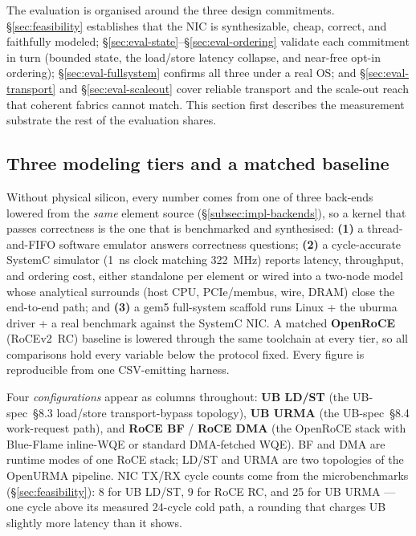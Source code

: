 \documentclass[10pt,twocolumn]{article}
\newcommand{\specsec}[1]{UB-spec~\S#1}
\begin{document}
The evaluation is organised around the three design commitments.
\S\ref{sec:feasibility} establishes that the NIC is synthesizable,
cheap, correct, and faithfully modeled;
\S\ref{sec:eval-state}--\S\ref{sec:eval-ordering} validate each
commitment in turn (bounded state, the load/store latency collapse,
and near-free opt-in ordering); \S\ref{sec:eval-fullsystem} confirms
all three under a real OS; and \S\ref{sec:eval-transport} and
\S\ref{sec:eval-scaleout} cover reliable transport and the scale-out
reach that coherent fabrics cannot match. This section first
describes the measurement substrate the rest of the evaluation
shares.

\subsection{Three modeling tiers and a matched baseline}
\label{subsec:tiers}
Without physical silicon, every number comes from one of three
back-ends lowered from the \emph{same} element source
(\S\ref{subsec:impl-backends}), so a kernel that passes correctness
is the one that is benchmarked and synthesised:
\textbf{(1)} a thread-and-FIFO software emulator answers
correctness questions; \textbf{(2)} a cycle-accurate SystemC
simulator (1~ns clock matching 322~MHz) reports latency,
throughput, and ordering cost, either standalone per element or
wired into a two-node model whose analytical surrounds (host CPU,
PCIe/membus, wire, DRAM) close the end-to-end path; and
\textbf{(3)} a gem5 full-system scaffold runs Linux + the uburma
driver + a real benchmark against the SystemC NIC. A matched
\textbf{OpenRoCE} (RoCEv2~RC) baseline is lowered through the same
toolchain at every tier, so all comparisons hold every variable
below the protocol fixed. Every figure is reproducible from one
CSV-emitting harness.

Four \emph{configurations} appear as columns throughout:
\textbf{UB LD/ST} (the \specsec{8.3} load/store transport-bypass topology),
\textbf{UB URMA} (the \specsec{8.4} work-request path), and \textbf{RoCE
BF} / \textbf{RoCE DMA} (the OpenRoCE stack with Blue-Flame
inline-WQE or standard DMA-fetched WQE). BF and DMA are runtime
modes of one RoCE stack; LD/ST and URMA are two topologies of the
OpenURMA pipeline. NIC TX/RX cycle counts come from the
microbenchmarks (\S\ref{sec:feasibility}): 8 for UB LD/ST, 9 for
RoCE RC, and 25 for UB URMA --- one cycle above its measured
24-cycle cold path, a rounding that charges UB slightly more
latency than it shows.
\end{document}
